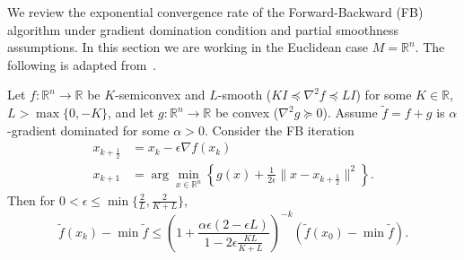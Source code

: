 \documentclass[final,12pt]{colt2018}
\newcommand{\R}{\mathbb{R}}
\begin{document}
We review the exponential convergence rate of the Forward-Backward (FB) algorithm under gradient domination condition and partial smoothness assumptions.
In this section we are working in the Euclidean case $M = \R^n$.
The following is adapted from~\cite[Theorem~4.2.b.ii]{GRV17}.

\begin{lemma}\label{Lem:FBRn}
Let $f \colon \R^n \to \R$ be $K$-semiconvex and $L$-smooth ($KI \preceq \nabla^2 f \preceq LI$) for some $K \in \R$, $L > \max\{0,-K\}$, and let $g \colon \R^n \to \R$ be convex ($\nabla^2 g \succeq 0$).
Assume $\tilde f = f+g$ is $\alpha$-gradient dominated for some $\alpha > 0$.
Consider the FB iteration
\begin{align*}
x_{k+\frac{1}{2}} &= x_k - \epsilon \nabla f(x_k) \\
x_{k+1} &= \arg\min_{x \in \R^n} \left\{ g(x) + \frac{1}{2\epsilon} \|x-x_{k+\frac{1}{2}}\|^2\right\}.
\end{align*}
Then for $0 < \epsilon \le \min\{\frac{2}{L},\frac{2}{K+L}\}$,
$$\tilde f(x_k) - \min \tilde f \le \left(1 + \frac{\alpha \epsilon(2-\epsilon L)}{1-2\epsilon\frac{KL}{K+L}} \right)^{-k} (\tilde f(x_0) - \min \tilde f).$$
\end{lemma}
\end{document}
